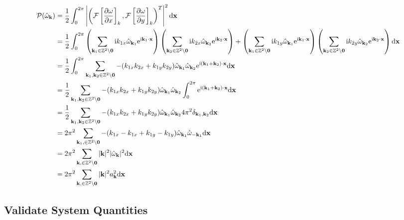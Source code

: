 \documentclass[9pt]{article}
\newcommand{\pder}[2]{\frac{\partial #1}{\partial #2}}               %
\newcommand{\ii}{\mathrm{i}}      								  %
\newcommand{\e}{\mathrm{e}}      								  %
\newcommand{\omegahat}[1]{\hat{\omega}_{ \mathbf{#1} } }								%
\newcommand{\bfx}{\mathbf{x}}								%
\newcommand{\bfk}{\mathbf{k}}								%
\newcommand{\bfkn}[1]{\mathbf{k}_{#1}}								%
\begin{document}
\begin{align}
\mathcal{P}(\omegahat{k}) &= \frac{1}{2}\int_0^{2\pi} \left|\left(\mathcal{F}\left[\pder{\omega}{x}\right]_k, \mathcal{F}\left[\pder{\omega}{y}\right]_k \right)^{T} \right|^2\mathrm{d}\bfx \notag \\
&=  \frac{1}{2}\int_0^{2\pi} \left(\sum_{\mathbf{k}_1\in \mathbb{Z}^2\setminus \mathbf{0}}\ii k_{1x}\hat{\omega}_{\mathbf{k}_1}\e^{\ii \mathbf{k}_1\cdot \mathbf{x}}\right)\left(\sum_{\mathbf{k}_2\in \mathbb{Z}^2\setminus \mathbf{0}}\ii k_{2x}\hat{\omega}_{\mathbf{k}_2}\e^{\ii \mathbf{k}_2\cdot \mathbf{x}}\right) + \left(\sum_{\mathbf{k}_1\in \mathbb{Z}^2\setminus \mathbf{0}}\ii k_{1y}\hat{\omega}_{\mathbf{k}_1}\e^{\ii \mathbf{k}_1\cdot \mathbf{x}}\right)\left(\sum_{\mathbf{k}_2\in \mathbb{Z}^2\setminus \mathbf{0}}\ii k_{2y}\hat{\omega}_{\mathbf{k}_2}\e^{\ii \mathbf{k}_2\cdot \mathbf{x}}\right) \mathrm{d}\bfx \notag\\
&= \frac{1}{2}\int_0^{2\pi} \sum_{\mathbf{k}_1, \mathbf{k}_2\in \mathbb{Z}^2\setminus \mathbf{0}} -(k_{1x}k_{2x} + k_{1y}k_{2y})\hat{\omega}_{\bfkn{1}}\hat{\omega}_{\bfkn{2}}\e^{\ii (\bfkn{1} + \bfkn{2}) \cdot \bfx}\mathrm{d}\bfx \notag\\
&=  \frac{1}{2}\sum_{\mathbf{k}_1, \mathbf{k}_2\in \mathbb{Z}^2\setminus \mathbf{0}} -(k_{1x}k_{2x} + k_{1y}k_{2y})\hat{\omega}_{\bfkn{1}}\hat{\omega}_{\bfkn{2}}\int_0^{2\pi}\e^{\ii (\bfkn{1} + \bfkn{2}) \cdot \bfx}\mathrm{d}\bfx \notag\\
&=  \frac{1}{2}\sum_{\mathbf{k}_1, \mathbf{k}_2\in \mathbb{Z}^2\setminus \mathbf{0}} -(k_{1x}k_{2x} + k_{1y}k_{2y})\hat{\omega}_{\bfkn{1}}\hat{\omega}_{\bfkn{2}} 4\pi^2 \delta_{\bfkn{1}, \bfkn{2}}\mathrm{d}\bfx \notag\\
&=  2\pi^2 \sum_{\mathbf{k}_1, \in \mathbb{Z}^2\setminus \mathbf{0}} -(k_{1x}-k_{1x} + k_{1y}-k_{1y})\hat{\omega}_{\bfkn{1}}\hat{\omega}_{-\bfkn{1}} \mathrm{d}\bfx \notag\\
&=  2\pi^2 \sum_{\mathbf{k}, \in \mathbb{Z}^2\setminus \mathbf{0}} |\bfk|^2 |\hat{\omega}_{\bfk}|^2 \mathrm{d}\bfx \notag\\
&=  2\pi^2 \sum_{\mathbf{k}, \in \mathbb{Z}^2\setminus \mathbf{0}} |\bfk|^2 a_{\bfk}^2 \mathrm{d}\bfx \notag\\
\label{eq:palinstrophy_fourier}
\end{align}


\subsection{Validate System Quantities}
\end{document}

